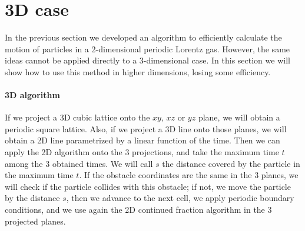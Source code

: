 \documentclass[prl,amsmath,amssymb, twocolumn, showpacs]{revtex4-1}
\begin{document}
\section{3D case}

In the previous section we developed an algorithm to efficiently calculate the motion of particles in a 2-dimensional periodic Lorentz gas. However, the same ideas cannot be applied directly to a 3-dimensional case. In this section we will show how to use this method in higher dimensions, losing some efficiency.

\paragraph{3D algorithm} If we project a 3D cubic lattice onto the $xy$, $xz$ or $yz$ plane, we will obtain a periodic square lattice. Also, if we project a 3D line onto those planes, we will obtain a 2D line parametrized by a linear function of the time. 
Then we can apply the 2D algorithm onto the 3 projections, and take the maximum time $t$ among the 3 obtained times. We will call $s$ the distance covered by the particle in the maximum time $t$. If the obstacle coordinates are the same in the 3 planes, we will check if the particle collides with this obstacle; if not, we move the particle by the distance $s$, then we advance to the next cell, we apply periodic boundary conditions, and we use again the 2D continued fraction algorithm in the 3 projected planes. 
\end{document}
